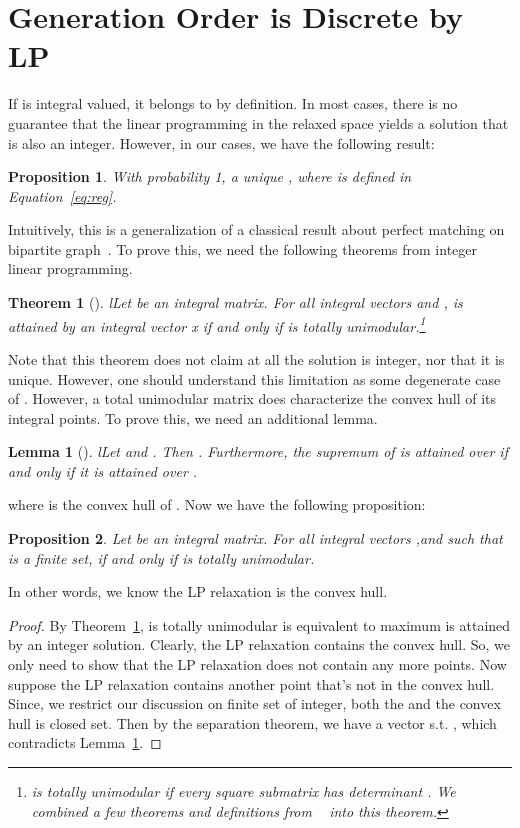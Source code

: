 \documentclass[11pt]{article}
\newtheorem{prop}{Proposition}
\newtheorem{theorem}{Theorem}
\newtheorem{lemma}{Lemma}
\begin{document}
\section{Generation Order is Discrete by LP} \label{append:valid}
If  is integral valued, it  belongs to  by definition. In most cases, there is no guarantee that the linear programming in the relaxed space yields a solution that is also an integer.  However, in our cases, we have the following result:
\begin{prop}\label{prop:uni}
With probability 1, a unique , where  is defined in Equation~\ref{eq:reg}.
\end{prop}
Intuitively, this is a generalization of a classical result about perfect matching on bipartite graph~\cite{Integer-Programming}. To prove this, we need the following theorems from integer linear programming.
\begin{theorem}[{\citealt[page 130,133]{Integer-Programming}}] l\label{thm:uni}
Let  be an  integral matrix. For all integral vectors  and  ,   is attained by an integral vector x  if and only if  is totally unimodular.\footnote{ is totally unimodular if every square submatrix has determinant
. We combined a few theorems and definitions from ~ into this theorem.}
\end{theorem}
Note that this theorem does not claim at all the solution is integer, nor that it is unique. However, one should understand this limitation as some degenerate case of . However, a total unimodular matrix does characterize the convex hull of its integral points. To prove this, we need an additional lemma. 
\begin{lemma}[{\citealt[page 21]{Integer-Programming}}] l\label{lemme:convex_hull}
Let  and . Then . Furthermore, the supremum of  is attained over  if and only if it is
attained over .
\end{lemma}
where  is the convex hull of . Now we have the following proposition:
\begin{prop}\label{prop:uni_convex_hull}
Let  be an  integral matrix. For all integral vectors  ,and   such that  is a finite set,    if and only if  is totally unimodular.
\end{prop}
In other words, we know the LP relaxation is the convex hull.
\begin{proof}
By Theorem~\ref{thm:uni},  is totally unimodular is equivalent to maximum is attained by an integer solution. Clearly, the LP relaxation contains the convex hull. So, we only need to show that the LP relaxation does not contain any more points. Now suppose the LP relaxation contains another point  that's not in the convex hull. Since, we restrict our discussion on finite set of integer, both the  and the convex hull is closed set. Then by the separation theorem, we have a vector  s.t. ,  which contradicts Lemma~\ref{lemme:convex_hull}.
\end{proof}
\end{document}
